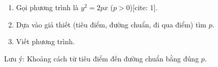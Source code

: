 \begin{enumerate}
\item Gọi phương trình là $y^2 = 2px$ ($p > 0$)[cite: 1].
\item Dựa vào giả thiết (tiêu điểm, đường chuẩn, đi qua điểm) tìm $p$.
\item Viết phương trình.
\end{enumerate}
Lưu ý: Khoảng cách từ tiêu điểm đến đường chuẩn bằng đúng $p$.
